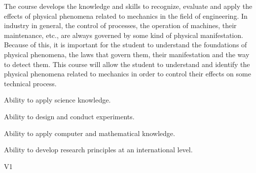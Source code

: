 \begin{syllabus}


\begin{justification}
   The course develops the knowledge and skills to recognize, evaluate and apply the effects of physical phenomena related to mechanics in the field of engineering. In industry in general, the control of processes, the operation of machines, their maintenance, etc., are always governed by some kind of physical manifestation. Because of this, it is important for the student to understand the foundations of physical phenomena, the laws that govern them, their manifestation and the way to detect them. This course will allow the student to understand and identify the physical phenomena related to mechanics in order to control their effects on some technical process. 
\end{justification}

\begin{goals}
\item Ability to apply science knowledge.
\item Ability to design and conduct experiments.
\item Ability to apply computer and mathematical knowledge.
\item Ability to develop research principles at an international level.
\end{goals}

\begin{outcomes}{V1}
    \item {}
    \item {}
    \item {}
    \item {}
\end{outcomes}


\end{syllabus}

